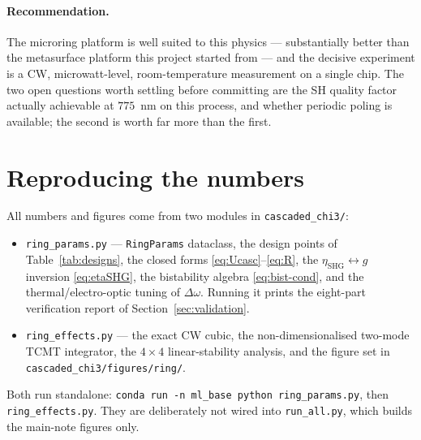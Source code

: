\documentclass[11pt,a4paper]{article}
\newcommand{\Dom}{\Delta\omega}
\newcommand{\etanorm}{\eta_{\text{SHG}}}
\begin{document}
\paragraph{Recommendation.}  The microring platform is well suited to
this physics --- substantially better than the metasurface platform this
project started from --- and the decisive experiment is a CW,
microwatt-level, room-temperature measurement on a single chip.  The
two open questions worth settling before committing are the SH quality
factor actually achievable at $775$~nm on this process, and whether
periodic poling is available; the second is worth far more than the
first.

\appendix
\section{Reproducing the numbers}\label{app:code}

All numbers and figures come from two modules in
\texttt{cascaded\_chi3/}:

\begin{itemize}[leftmargin=1.6em,itemsep=2pt]
\item \texttt{ring\_params.py} --- \texttt{RingParams} dataclass, the
  design points of Table~\ref{tab:designs}, the closed forms
  \eqref{eq:Ucasc}--\eqref{eq:R}, the $\etanorm\leftrightarrow g$
  inversion \eqref{eq:etaSHG}, the bistability algebra
  \eqref{eq:bist-cond}, and the thermal/electro-optic tuning of $\Dom$.
  Running it prints the eight-part verification report of
  Section~\ref{sec:validation}.
\item \texttt{ring\_effects.py} --- the exact CW cubic, the
  non-dimensionalised two-mode TCMT integrator, the $4\times4$
  linear-stability analysis, and the figure set in
  \texttt{cascaded\_chi3/figures/ring/}.
\end{itemize}

\noindent
Both run standalone: \verb|conda run -n ml_base python ring_params.py|,
then \verb|ring_effects.py|.  They are deliberately not wired into
\texttt{run\_all.py}, which builds the main-note figures only.
\end{document}
